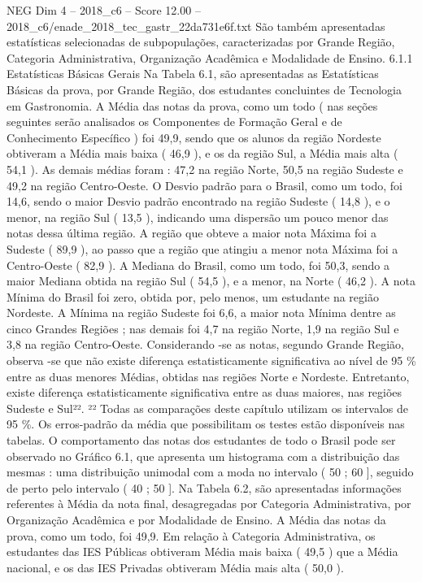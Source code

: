 \begin{textsample}{NEG Dim 4 – 2018\_c6 – Score 12.00 – 2018\_c6/enade\_2018\_tec\_gastr\_22da731e6f.txt}
São também apresentadas estatísticas selecionadas de subpopulações, caracterizadas por Grande Região, Categoria Administrativa, Organização Acadêmica e Modalidade de Ensino. 6.1.1 Estatísticas Básicas Gerais Na Tabela 6.1, são apresentadas as Estatísticas Básicas da prova, por Grande Região, dos estudantes concluintes de Tecnologia em Gastronomia.
A Média das notas da prova, como um todo ( nas seções seguintes serão analisados os Componentes de Formação Geral e de Conhecimento Específico ) foi 49,9, sendo que os alunos da região Nordeste obtiveram a Média mais baixa ( 46,9 ), e os da região Sul, a Média mais alta ( 54,1 ).
As demais médias foram : 47,2 na região Norte, 50,5 na região Sudeste e 49,2 na região Centro-Oeste.
O Desvio padrão para o Brasil, como um todo, foi 14,6, sendo o maior Desvio padrão encontrado na região Sudeste ( 14,8 ), e o menor, na região Sul ( 13,5 ), indicando uma dispersão um pouco menor das notas dessa última região.
A região que obteve a maior nota Máxima foi a Sudeste ( 89,9 ), ao passo que a região que atingiu a menor nota Máxima foi a Centro-Oeste ( 82,9 ).
A Mediana do Brasil, como um todo, foi 50,3, sendo a maior Mediana obtida na região Sul ( 54,5 ), e a menor, na Norte ( 46,2 ).
A nota Mínima do Brasil foi zero, obtida por, pelo menos, um estudante na região Nordeste.
A Mínima na região Sudeste foi 6,6, a maior nota Mínima dentre as cinco Grandes Regiões ; nas demais foi 4,7 na região Norte, 1,9 na região Sul e 3,8 na região Centro-Oeste.
Considerando -se as notas, segundo Grande Região, observa -se que não existe diferença estatisticamente significativa ao nível de 95 \% entre as duas menores Médias, obtidas nas regiões Norte e Nordeste.
Entretanto, existe diferença estatisticamente significativa entre as duas maiores, nas regiões Sudeste e Sul²². ²² Todas as comparações deste capítulo utilizam os intervalos de 95 \%.
Os erros-padrão da média que possibilitam os testes estão disponíveis nas tabelas.
O comportamento das notas dos estudantes de todo o Brasil pode ser observado no Gráfico 6.1, que apresenta um histograma com a distribuição das mesmas : uma distribuição unimodal com a moda no intervalo ( 50 ; 60 ], seguido de perto pelo intervalo ( 40 ; 50 ].
Na Tabela 6.2, são apresentadas informações referentes à Média da nota final, desagregadas por Categoria Administrativa, por Organização Acadêmica e por Modalidade de Ensino.
A Média das notas da prova, como um todo, foi 49,9.
Em relação à Categoria Administrativa, os estudantes das IES Públicas obtiveram Média mais baixa ( 49,5 ) que a Média nacional, e os das IES Privadas obtiveram Média mais alta ( 50,0 ).

\end{textsample}
